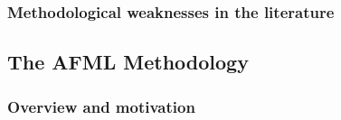 \documentclass[12pt,a4paper,oneside]{article}
\begin{document}
%


\subsubsection{Methodological weaknesses in the literature}\label{subsubsec:btc_weaknesses}

%


\subsection{The AFML Methodology}\label{subsec:lit_afml}



\subsubsection{Overview and motivation}\label{subsubsec:afml_overview}
\end{document}

